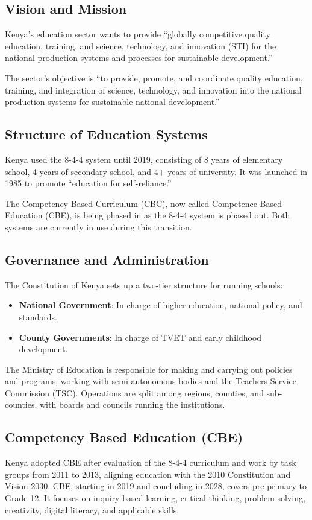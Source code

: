 \documentclass[12pt,a4paper]{article}
\begin{document}
\subsection*{Vision and Mission}
Kenya's education sector wants to provide ``globally competitive quality education, training, and science, technology, and innovation (STI) for the national production systems and processes for sustainable development.''

The sector's objective is ``to provide, promote, and coordinate quality education, training, and integration of science, technology, and innovation into the national production systems for sustainable national development.''

\subsection*{Structure of Education Systems}
Kenya used the 8-4-4 system until 2019, consisting of 8 years of elementary school, 4 years of secondary school, and 4+ years of university. It was launched in 1985 to promote ``education for self-reliance.''

The Competency Based Curriculum (CBC), now called Competence Based Education (CBE), is being phased in as the 8-4-4 system is phased out. Both systems are currently in use during this transition.

\subsection*{Governance and Administration}
The Constitution of Kenya sets up a two-tier structure for running schools:
\begin{itemize}
    \item \textbf{National Government}: In charge of higher education, national policy, and standards.
    \item \textbf{County Governments}: In charge of TVET and early childhood development.
\end{itemize}
The Ministry of Education is responsible for making and carrying out policies and programs, working with semi-autonomous bodies and the Teachers Service Commission (TSC). Operations are split among regions, counties, and sub-counties, with boards and councils running the institutions.

\subsection*{Competency Based Education (CBE)}
Kenya adopted CBE after evaluation of the 8-4-4 curriculum and work by task groups from 2011 to 2013, aligning education with the 2010 Constitution and Vision 2030. CBE, starting in 2019 and concluding in 2028, covers pre-primary to Grade 12. It focuses on inquiry-based learning, critical thinking, problem-solving, creativity, digital literacy, and applicable skills.
\end{document}
